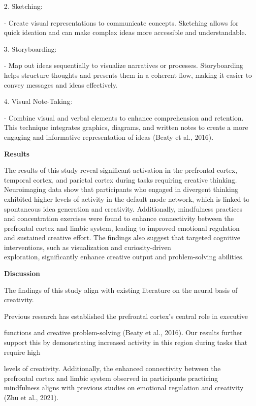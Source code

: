 \documentclass[
]{article}
\begin{document}
2. Sketching:

- Create visual representations to communicate concepts. Sketching
allows for quick ideation and can make complex ideas more accessible and
understandable.

3. Storyboarding:

- Map out ideas sequentially to visualize narratives or processes.
Storyboarding helps structure thoughts and presents them in a coherent
flow, making it easier to convey messages and ideas effectively.

4. Visual Note-Taking:

- Combine visual and verbal elements to enhance comprehension and
retention. This technique integrates graphics, diagrams, and written
notes to create a more engaging and informative representation of ideas
(Beaty et al., 2016).

\textbf{Results}

The results of this study reveal significant activation in the
prefrontal cortex, temporal cortex, and parietal cortex during tasks
requiring creative thinking. Neuroimaging data show that participants
who engaged in divergent thinking exhibited higher levels of activity in
the default mode network, which is linked to spontaneous idea generation
and creativity. Additionally, mindfulness practices and concentration
exercises were found to enhance connectivity between the prefrontal
cortex and limbic system, leading to improved emotional regulation and
sustained creative effort. The findings also suggest that targeted
cognitive interventions, such as visualization and curiosity-driven\\
exploration, significantly enhance creative output and problem-solving
abilities.

\textbf{Discussion}

The findings of this study align with existing literature on the neural
basis of creativity.

Previous research has established the prefrontal cortex's central role
in executive

functions and creative problem-solving (Beaty et al., 2016). Our results
further support this by demonstrating increased activity in this region
during tasks that require high

levels of creativity. Additionally, the enhanced connectivity between
the prefrontal cortex and limbic system observed in participants
practicing mindfulness aligns with previous studies on emotional
regulation and creativity (Zhu et al., 2021).
\end{document}
